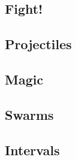 \begin{multicols}{2}

\subsection*{}



\subsection*{Fight!}





\commonWeaponsChart





\subsection*{Projectiles}



\commonArmourChart

\subsection*{Magic}



\subsection*{Swarms}



\subsection*{Intervals}



\end{multicols}

